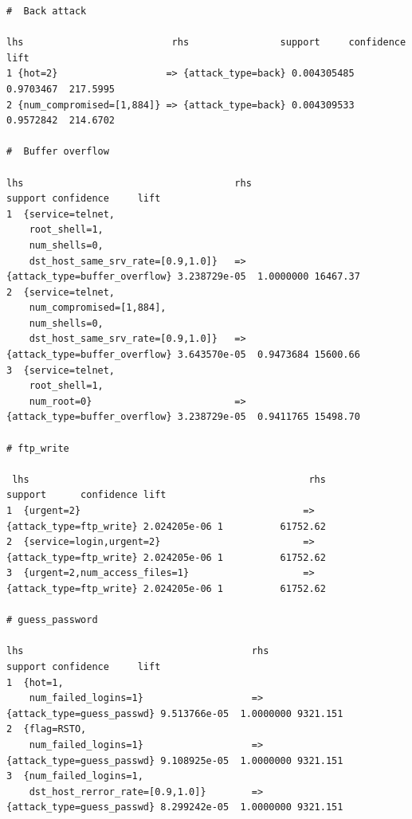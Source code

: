 \documentclass[11pt]{article}
\begin{document}
\begin{Verbatim}[fontsize=\tiny]
#  Back attack

lhs                          rhs                support     confidence lift    
1 {hot=2}                   => {attack_type=back} 0.004305485 0.9703467  217.5995
2 {num_compromised=[1,884]} => {attack_type=back} 0.004309533 0.9572842  214.6702

#  Buffer overflow

lhs                                     rhs                                support confidence     lift
1  {service=telnet,                                                                                      
    root_shell=1,                                                                                        
    num_shells=0,                                                                                        
    dst_host_same_srv_rate=[0.9,1.0]}   => {attack_type=buffer_overflow} 3.238729e-05  1.0000000 16467.37
2  {service=telnet,                                                                                      
    num_compromised=[1,884],                                                                             
    num_shells=0,                                                                                        
    dst_host_same_srv_rate=[0.9,1.0]}   => {attack_type=buffer_overflow} 3.643570e-05  0.9473684 15600.66
3  {service=telnet,                                                                                      
    root_shell=1,                                                                                        
    num_root=0}                         => {attack_type=buffer_overflow} 3.238729e-05  0.9411765 15498.70

# ftp_write

 lhs                                                 rhs                     support      confidence lift    
1  {urgent=2}                                       => {attack_type=ftp_write} 2.024205e-06 1          61752.62
2  {service=login,urgent=2}                         => {attack_type=ftp_write} 2.024205e-06 1          61752.62
3  {urgent=2,num_access_files=1}                    => {attack_type=ftp_write} 2.024205e-06 1          61752.62

# guess_password

lhs                                        rhs                             support confidence     lift
1  {hot=1,                                                                                               
    num_failed_logins=1}                   => {attack_type=guess_passwd} 9.513766e-05  1.0000000 9321.151
2  {flag=RSTO,                                                                                           
    num_failed_logins=1}                   => {attack_type=guess_passwd} 9.108925e-05  1.0000000 9321.151
3  {num_failed_logins=1,                                                                                 
    dst_host_rerror_rate=[0.9,1.0]}        => {attack_type=guess_passwd} 8.299242e-05  1.0000000 9321.151
	

\end{Verbatim}
\end{document}
